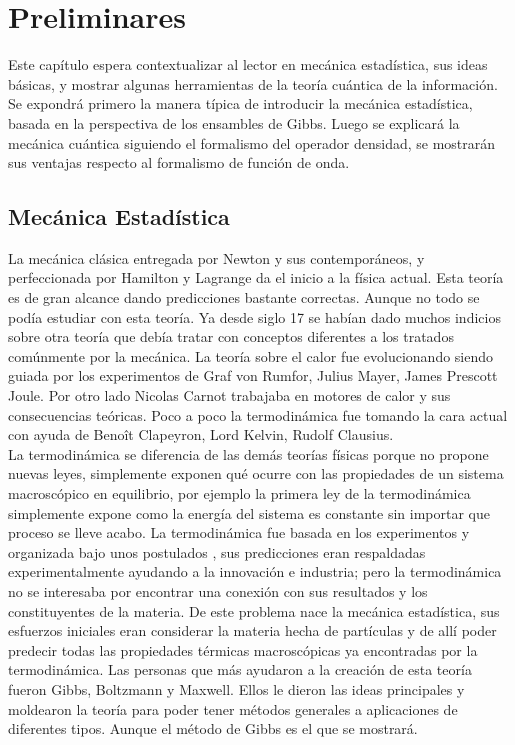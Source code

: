 \chapter{Preliminares}

Este capítulo espera contextualizar al lector en mecánica estadística, sus ideas básicas, y mostrar algunas herramientas de la teoría cuántica de la información. Se expondrá  primero la manera típica de introducir la mecánica estadística, basada en la perspectiva de los ensambles de Gibbs. Luego se explicará la mecánica cuántica siguiendo el formalismo del operador densidad, se mostrarán sus ventajas respecto al formalismo de función de onda.


\section{Mecánica Estadística}
La mecánica clásica entregada por Newton y sus contemporáneos, y perfeccionada por Hamilton y Lagrange da el inicio a la física actual. Esta teoría es de gran alcance dando predicciones bastante correctas. Aunque no todo se podía estudiar con esta teoría. Ya desde siglo 17 se habían dado muchos indicios sobre otra teoría que debía tratar con conceptos diferentes a los tratados comúnmente por la mecánica. La teoría sobre el calor fue evolucionando siendo guiada por los experimentos de Graf von Rumfor, Julius Mayer, James Prescott Joule. Por otro lado Nicolas Carnot trabajaba en motores de calor y sus consecuencias teóricas. Poco a poco la termodinámica fue tomando la cara actual con ayuda de Benoît Clapeyron, Lord Kelvin, Rudolf Clausius. 
\\
La termodinámica se diferencia de las demás teorías físicas porque no propone nuevas leyes, simplemente exponen qué ocurre con las propiedades de un sistema macroscópico en equilibrio, por ejemplo la primera ley de la termodinámica simplemente expone como la energía del sistema es constante sin importar que proceso se lleve acabo. La termodinámica fue basada en los experimentos y organizada bajo unos postulados \cite{CallenThermo}, sus predicciones eran respaldadas experimentalmente ayudando a la innovación e industria; pero la termodinámica no se interesaba por encontrar una conexión con sus resultados y los constituyentes de la materia. De este problema nace la mecánica estadística, sus esfuerzos iniciales eran considerar la materia hecha de partículas y de allí poder predecir todas las propiedades térmicas macroscópicas ya encontradas por la termodinámica. Las personas que más ayudaron a la creación de esta teoría fueron Gibbs, Boltzmann y Maxwell. Ellos le dieron las ideas principales y moldearon la teoría para poder tener métodos generales a aplicaciones de diferentes tipos. Aunque el método de Gibbs es el que se mostrará.
